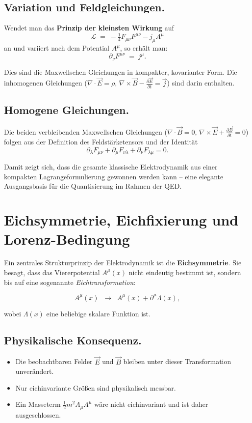 \subsection*{Variation und Feldgleichungen.}
Wendet man das \textbf{Prinzip der kleinsten Wirkung} auf
\[
\mathcal{L} \;=\; -\tfrac{1}{4} F_{\mu\nu}F^{\mu\nu} - j_\mu A^\mu
\]
an und variiert nach dem Potential \( A^\mu \), so erhält man:
\[
\partial_\nu F^{\mu\nu} \;=\; j^\mu .
\]

Dies sind die Maxwellschen Gleichungen in kompakter, 
kovarianter Form. Die inhomogenen Gleichungen
(\( \nabla \cdot \vec{E} = \rho, \, \nabla \times \vec{B} - \tfrac{\partial \vec{E}}{\partial t} = \vec{j} \))
sind darin enthalten.

\subsection*{Homogene Gleichungen.}
Die beiden verbleibenden Maxwellschen Gleichungen 
(\( \nabla \cdot \vec{B} = 0, \, \nabla \times \vec{E} + \tfrac{\partial \vec{B}}{\partial t} = 0 \))
folgen aus der Definition des Feldstärketensors
und der Identität
\[
\partial_\lambda F_{\mu\nu} + \partial_\mu F_{\nu\lambda} + \partial_\nu F_{\lambda\mu} = 0 .
\]

\medskip
Damit zeigt sich, dass die gesamte klassische Elektrodynamik 
aus einer kompakten Lagrangeformulierung gewonnen werden kann – 
eine elegante Ausgangsbasis für die Quantisierung im Rahmen der QED.
\section{Eichsymmetrie, Eichfixierung und \newline Lorenz-Bedingung}
\label{anhangA:eichsymmetrie}

Ein zentrales Strukturprinzip der Elektrodynamik ist die \textbf{Eichsymmetrie}.
Sie besagt, dass das Viererpotential \( A^\mu(x) \) nicht eindeutig bestimmt ist,
sondern bis auf eine sogenannte \emph{Eichtransformation}:

\[
A^\mu(x) \;\;\rightarrow\;\; A^\mu(x) + \partial^\mu \Lambda(x),
\]

wobei \( \Lambda(x) \) eine beliebige skalare Funktion ist.

\subsection*{Physikalische Konsequenz.}
\begin{itemize}
	\item Die beobachtbaren Felder \( \vec{E} \) und \( \vec{B} \) 
	bleiben unter dieser Transformation unverändert.
	\item Nur eichinvariante Größen sind physikalisch messbar.
	\item Ein Masseterm \( \tfrac{1}{2} m^2 A_\mu A^\mu \) 
	wäre nicht eichinvariant und ist daher ausgeschlossen.
\end{itemize}


